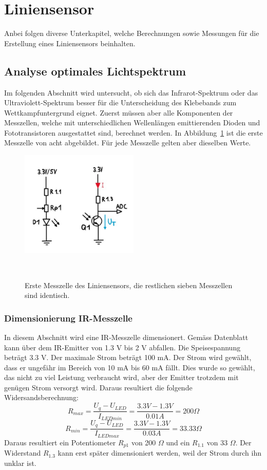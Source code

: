 \documentclass[main.tex]{subfiles} %
\begin{document}

\section{Liniensensor}
\label{anhang:Liniensensor}
Anbei folgen diverse Unterkapitel, welche Berechnungen sowie Messungen für die Erstellung eines Liniensensors beinhalten.


\subsection{Analyse optimales Lichtspektrum}
\label{anhang:Liniensensor_Lichtspektrum}

Im folgenden Abschnitt wird untersucht, ob sich das Infrarot-Spektrum oder das Ultraviolett-Spektrum besser für
die Unterscheidung des Klebebands zum Wettkampfuntergrund eignet. Zuerst müssen aber alle Komponenten der Messzellen, 
welche mit unterschiedlichen Wellenlängen emittierenden Dioden und Fototransistoren ausgestattet sind, berechnet werden.
In Abbildung~\ref{fig:Schema_Messzelle_Liniensensor} ist die erste Messzelle von acht abgebildet. Für jede Messzelle
gelten aber dieselben Werte.

\begin{figure}[h!]
    \centering
    \includegraphics[width=0.5\textwidth]{./fig_Liniensensor/Schema_Messzelle_Liniensensor}
    \caption{Erste Messzelle des Liniensensors, die restlichen sieben Messzellen sind identisch.}~\label{fig:Schema_Messzelle_Liniensensor}
\end{figure}


\subsubsection{Dimensionierung IR-Messzelle}
In diesem Abschnitt wird eine IR-Messzelle dimensionert. Gemäss Datenblatt kann über dem IR-Emitter von 1.3 V bis 2 V
abfallen. Die Speisespannung beträgt 3.3 V. Der maximale Strom beträgt 100 mA. Der Strom wird gewählt, dass er ungefähr im 
Bereich von 10 mA bis 60 mA fällt. Dies wurde so gewählt, das nicht zu viel Leistung verbraucht wird, aber der Emitter trotzdem 
mit genügen Strom versorgt wird. Daraus resultiert die folgende Widersandsberechnung:
\[
    R_{max} = \frac{U_q - U_{LED}}{I_{LEDmin}} = \frac{3.3 V - 1.3 V}{0.01A} = 200 \Omega
\]
\[
    R_{min} = \frac{U_q - U_{LED}}{I_{LEDmax}} = \frac{3.3 V - 1.3 V}{0.03A} = 33.33 \Omega
\]
Daraus resultiert ein Potentiometer $R_{p1}$ von 200 $\Omega$ und ein $R_{1.1}$ von 33 $\Omega$.
Der Widerstand $R_{1.3}$ kann erst später dimensioniert werden, weil der Strom durch ihn unklar ist.
\end{document}
